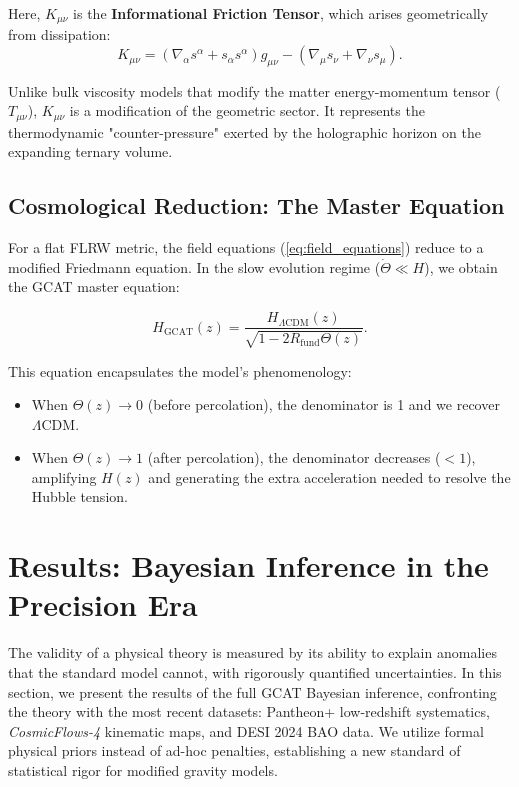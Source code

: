 \documentclass[12pt, a4paper]{article}
\theoremstyle{plain}
\theoremstyle{definition}
\begin{document}
Here, $K_{\mu\nu}$ is the \textbf{Informational Friction Tensor}, which arises geometrically from dissipation:
\begin{equation}
K_{\mu\nu} = \left(\nabla_\alpha s^\alpha + s_\alpha s^\alpha \right) g_{\mu\nu} - \left(\nabla_\mu s_\nu + \nabla_\nu s_\mu \right).
\end{equation}

Unlike bulk viscosity models that modify the matter energy-momentum tensor ($T_{\mu\nu}$), $K_{\mu\nu}$ is a modification of the geometric sector. It represents the thermodynamic "counter-pressure" exerted by the holographic horizon on the expanding ternary volume.

\subsection{Cosmological Reduction: The Master Equation}

For a flat FLRW metric, the field equations (\ref{eq:field_equations}) reduce to a modified Friedmann equation. In the slow evolution regime ($\dot{\Theta} \ll H$), we obtain the GCAT master equation:

\begin{equation}
H_{\text{GCAT}}(z) = \frac{H_{\Lambda\text{CDM}}(z)}{\sqrt{1 - 2 R_{\text{fund}} \Theta(z)}}.
\label{eq:master_equation}
\end{equation}

This equation encapsulates the model's phenomenology:
\begin{itemize}
    \item When $\Theta(z) \to 0$ (before percolation), the denominator is 1 and we recover $\Lambda$CDM.
    \item When $\Theta(z) \to 1$ (after percolation), the denominator decreases ($<1$), amplifying $H(z)$ and generating the extra acceleration needed to resolve the Hubble tension.
\end{itemize}

\section{Results: Bayesian Inference in the Precision Era}
\label{sec:results}

The validity of a physical theory is measured by its ability to explain anomalies that the standard model cannot, with rigorously quantified uncertainties. In this section, we present the results of the full GCAT Bayesian inference, confronting the theory with the most recent datasets: Pantheon+ low-redshift systematics, \textit{CosmicFlows-4} kinematic maps, and DESI 2024 BAO data. We utilize formal physical priors instead of ad-hoc penalties, establishing a new standard of statistical rigor for modified gravity models.
\end{document}
